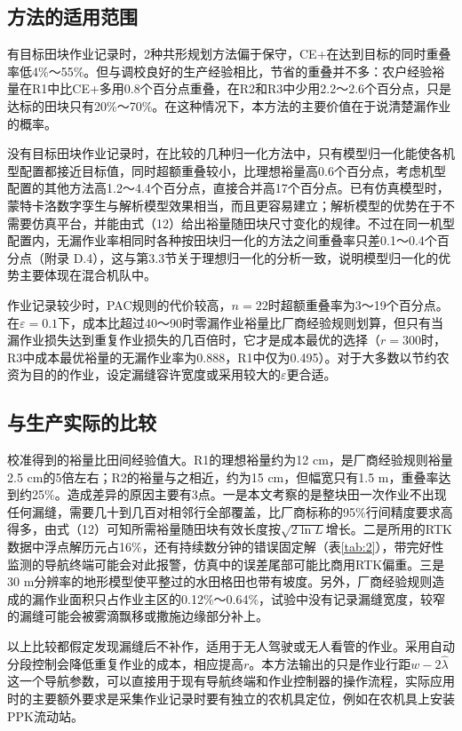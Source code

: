 \documentclass[preprint,12pt,number,sort&compress]{elsarticle}
\begin{document}
\subsection{方法的适用范围}

有目标田块作业记录时，2种共形规划方法偏于保守，CE+在达到目标的同时重叠率低4\%～55\%。但与调校良好的生产经验相比，节省的重叠并不多：农户经验裕量在R1中比CE+多用0.8个百分点重叠，在R2和R3中少用2.2～2.6个百分点，只是达标的田块只有20\%～70\%。在这种情况下，本方法的主要价值在于说清楚漏作业的概率。

没有目标田块作业记录时，在比较的几种归一化方法中，只有模型归一化能使各机型配置都接近目标值，同时超额重叠较小，比理想裕量高0.6个百分点，考虑机型配置的其他方法高1.2～4.4个百分点，直接合并高17个百分点。已有仿真模型时，蒙特卡洛数字孪生与解析模型效果相当，而且更容易建立；解析模型的优势在于不需要仿真平台，并能由式（12）给出裕量随田块尺寸变化的规律。不过在同一机型配置内，无漏作业率相同时各种按田块归一化的方法之间重叠率只差0.1～0.4个百分点（附录 D.4），这与第3.3节关于理想归一化的分析一致，说明模型归一化的优势主要体现在混合机队中。

作业记录较少时，PAC规则的代价较高，\(n=22\)时超额重叠率为3～19个百分点。在\(\varepsilon=0.1\)下，成本比超过40～90时零漏作业裕量比厂商经验规则划算，但只有当漏作业损失达到重复作业损失的几百倍时，它才是成本最优的选择（\(r=300\)时，R3中成本最优裕量的无漏作业率为0.888，R1中仅为0.495）。对于大多数以节约农资为目的的作业，设定漏缝容许宽度或采用较大的\(\varepsilon\)更合适。

\subsection{与生产实际的比较}

校准得到的裕量比田间经验值大。R1的理想裕量约为12 cm，是厂商经验规则裕量2.5 cm的5倍左右；R2的裕量与之相近，约为15 cm，但幅宽只有1.5 m，重叠率达到约25\%。造成差异的原因主要有3点。一是本文考察的是整块田一次作业不出现任何漏缝，需要几十到几百对相邻行全部覆盖，比厂商标称的95\%行间精度要求高得多，由式（12）可知所需裕量随田块有效长度按\(\sqrt{2\ln L}\)增长。二是所用的RTK数据中浮点解历元占16\%，还有持续数分钟的错误固定解（表\ref{tab:2}），带完好性监测的导航终端可能会对此报警，仿真中的误差尾部可能比商用RTK偏重。三是30 m分辨率的地形模型使平整过的水田格田也带有坡度。另外，厂商经验规则造成的漏作业面积只占作业主区的0.12\%～0.64\%，试验中没有记录漏缝宽度，较窄的漏缝可能会被雾滴飘移或撒施边缘部分补上。

以上比较都假定发现漏缝后不补作，适用于无人驾驶或无人看管的作业。采用自动分段控制会降低重复作业的成本，相应提高\(r\)。本方法输出的只是作业行距\(w-2\hat\lambda\)这一个导航参数，可以直接用于现有导航终端和作业控制器的操作流程，实际应用时的主要额外要求是采集作业记录时要有独立的农机具定位，例如在农机具上安装PPK流动站。
\end{document}
